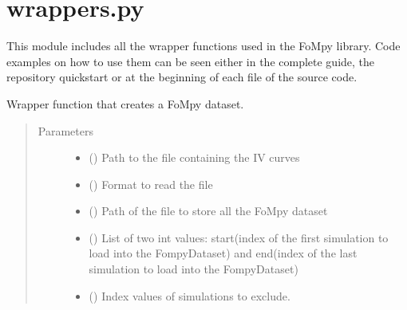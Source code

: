 \documentclass[letterpaper,10pt,english,openany, oneside]{sphinxmanual}
\begin{document}
\label{\detokenize{index:module-fompy.wrappers}}

\section{wrappers.py}
\label{\detokenize{index:wrappers-py}}
This module includes all the wrapper functions used in the FoMpy library.
Code examples on how to use them can be seen either in the complete guide, the repository quickstart
or at the beginning of each file of the source code.

\begin{fulllineitems}
\label{\detokenize{index:fompy.wrappers.dataset}}
Wrapper function that creates a FoMpy dataset.
\begin{quote}\begin{description}
\item[{Parameters}] \leavevmode\begin{itemize}
\item {} 
 () \textendash{} Path to the file containing the IV curves

\item {} 
 () \textendash{} Format to read the file

\item {} 
 () \textendash{} Path of the file to store all the FoMpy dataset

\item {} 
 () \textendash{} List of two int values: start(index of the first simulation to load into the FompyDataset)
and end(index of the last simulation to load into the FompyDataset)

\item {} 
 () \textendash{} Index values of simulations to exclude.


\end{itemize}
\end{description}
\end{quote}
\end{fulllineitems}
\end{document}
